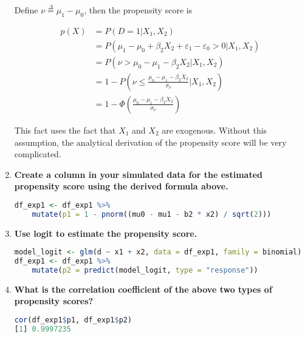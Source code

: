 \documentclass[11pt]{article}
\begin{document}
\begin{enumerate}
            Define $\nu \overset{\Delta}{=} \mu_1 - \mu_0$, then the propensity score is

            \[ \begin{aligned}
                p(X) &= P(D = 1 | X_1, X_2) \\
                     &= P(\mu_1 - \mu_0 + \beta_2 X_2 + \varepsilon_1 - \varepsilon_0 > 0 | X_1, X_2) \\
                     &= P(\nu > \mu_0 - \mu_1 - \beta_2 X_2 | X_1, X_2) \\
                     &= 1 - P\left(\nu \leq \frac{\mu_0 - \mu_1 - \beta_2 X_2}{\sigma_{\nu}} | X_1, X_2\right) \\
                     &= 1 - \Phi\left(\frac{\mu_0 - \mu_1 - \beta_2 X_2}{\sigma_{\nu}}\right)
            \end{aligned} \]

            This fact uses the fact that $X_1$ and $X_2$ are exogenous. Without this assumption, the analytical derivation of the propensity score will be very complicated.
            
            \item {\bf Create a column in your simulated data for the estimated propensity score using the derived formula above.}
            
            \begin{lstlisting}[language=R]
df_exp1 <- df_exp1 %>%
    mutate(p1 = 1 - pnorm((mu0 - mu1 - b2 * x2) / sqrt(2)))
            \end{lstlisting}
            
            \item {\bf Use logit to estimate the propensity score.}
            
            \begin{lstlisting}[language=R]
model_logit <- glm(d ~ x1 + x2, data = df_exp1, family = binomial)
df_exp1 <- df_exp1 %>%
    mutate(p2 = predict(model_logit, type = "response"))
            \end{lstlisting}
            
            \item {\bf What is the correlation coefficient of the above two types of propensity scores?}
            
            \begin{lstlisting}[language=R]
cor(df_exp1$p1, df_exp1$p2)
[1] 0.9997235
            \end{lstlisting}    
            

\end{enumerate}
\end{document}
